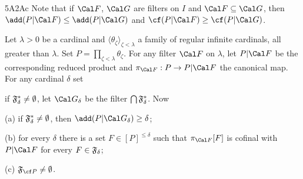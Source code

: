 \spheader 5A2Ac Note that if $\Cal F$, $\Cal G$ are filters on $I$
and $\Cal F\subseteq\Cal G$, then $\add(P|\Cal F)\le\add(P|\Cal G)$
and $\cf(P|\Cal F)\ge\cf(P|\Cal G)$.   

Let $\lambda>0$ be a cardinal and
$\langle\theta_{\zeta}\rangle_{\zeta<\lambda}$ a family of regular
infinite cardinals, all greater than $\lambda$.   Set
$P=\prod_{\zeta<\lambda}\theta_{\zeta}$.
For any filter $\Cal F$ on $\lambda$, let $P|\Cal F$ be the corresponding
reduced product and $\pi_{\Cal F}:P\to P|\Cal F$
the canonical map.   For any cardinal $\delta$ set



\noindent if $\frak F^*_{\delta}\ne\emptyset$, let $\Cal G_{\delta}$
be the filter $\bigcap\frak F^*_{\delta}$.   Now

(a) if $\frak F^*_{\delta}\ne\emptyset$, then
$\add(P|\Cal G_{\delta})\ge\delta$;

(b) for every $\delta$ there is a set
$F\in[P]^{\le\delta}$ such that $\pi_{\Cal F}[F]$ is
cofinal with $P|\Cal F$ for every $F\in\frak F_{\delta}$;

(c) $\frak F_{\cf P}\ne\emptyset$.

